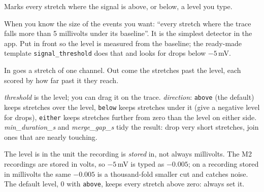 Marks every stretch where the signal is above, or below, a level you type.

When you know the size of the events you want: ``every stretch where the trace falls more
than 5 millivolts under its baseline''. It is the simplest detector in the app. Put
 in front so the level is measured from the baseline; the
ready-made template \texttt{signal\_threshold} does that and looks for drops below $-5$\,mV.

In goes a stretch of one channel. Out come the stretches past the level, each scored by how
far past it they reach.

\emph{threshold} is the level; you can drag it on the trace. \emph{direction}: \texttt{above}
(the default) keeps stretches over the level, \texttt{below} keeps stretches under it (give a
negative level for drops), \texttt{either} keeps stretches further from zero than the level on
either side. \emph{min\_duration\_s} and \emph{merge\_gap\_s} tidy the result: drop very short
stretches, join ones that are nearly touching.

The level is in the unit the recording is \emph{stored} in, not always millivolts. The M2
recordings are stored in volts, so $-5$\,mV is typed as $-0.005$; on a recording stored in
millivolts the same $-0.005$ is a thousand-fold smaller cut and catches noise. The default level,
0 with \texttt{above}, keeps every stretch above zero: always set it.
